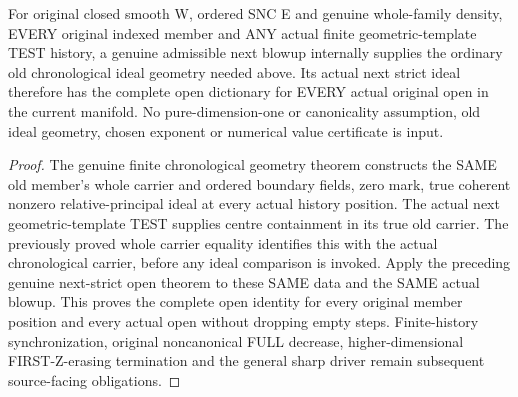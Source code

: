 \begin{theorem}
\label{hir:sharp-original-member-next-strict-open-naturality}
\leanok
For original closed smooth W, ordered SNC E and genuine whole-family density,
EVERY original indexed member and ANY actual finite geometric-template TEST
history, a genuine admissible next blowup internally supplies the ordinary
old chronological ideal geometry needed above. Its actual next strict ideal
therefore has the complete open dictionary for EVERY actual original open
in the current manifold. No pure-dimension-one or canonicality assumption,
old ideal geometry, chosen exponent or numerical value certificate is input.
\end{theorem}
\begin{proof}
The genuine finite chronological geometry theorem constructs the SAME old
member's whole carrier and ordered boundary fields, zero mark, true coherent
nonzero relative-principal ideal at every actual history position. The actual
next geometric-template TEST supplies centre containment in its true old
carrier. The previously proved whole carrier equality identifies this with
the actual chronological carrier, before any ideal comparison is invoked.
Apply the preceding genuine next-strict open theorem to these SAME data and
the SAME actual blowup. This proves the complete open identity for every
original member position and every actual open without dropping empty steps.
Finite-history synchronization, original noncanonical FULL decrease,
higher-dimensional FIRST-Z-erasing termination and the general sharp driver
remain subsequent source-facing obligations.
\end{proof}

